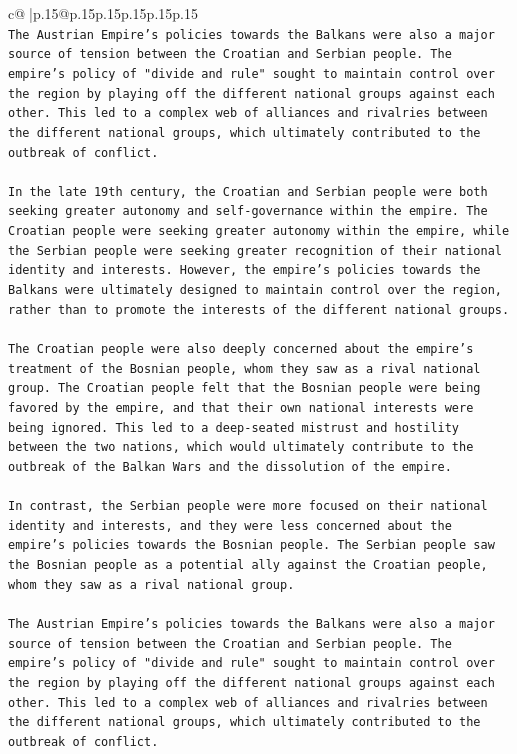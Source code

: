 \documentclass{article}
\begin{document}
{\begin{supertabular}{c@{$\;$}|p{.15\linewidth}@{}p{.15\linewidth}p{.15\linewidth}p{.15\linewidth}p{.15\linewidth}p{.15\linewidth}}
{{{\\ 
\texttt{The Austrian Empire's policies towards the Balkans were also a major source of tension between the Croatian and Serbian people. The empire's policy of "divide and rule" sought to maintain control over the region by playing off the different national groups against each other. This led to a complex web of alliances and rivalries between the different national groups, which ultimately contributed to the outbreak of conflict.} \\
\\ 
\texttt{In the late 19th century, the Croatian and Serbian people were both seeking greater autonomy and self{-}governance within the empire. The Croatian people were seeking greater autonomy within the empire, while the Serbian people were seeking greater recognition of their national identity and interests. However, the empire's policies towards the Balkans were ultimately designed to maintain control over the region, rather than to promote the interests of the different national groups.} \\
\\ 
\texttt{The Croatian people were also deeply concerned about the empire's treatment of the Bosnian people, whom they saw as a rival national group. The Croatian people felt that the Bosnian people were being favored by the empire, and that their own national interests were being ignored. This led to a deep{-}seated mistrust and hostility between the two nations, which would ultimately contribute to the outbreak of the Balkan Wars and the dissolution of the empire.} \\
\\ 
\texttt{In contrast, the Serbian people were more focused on their national identity and interests, and they were less concerned about the empire's policies towards the Bosnian people. The Serbian people saw the Bosnian people as a potential ally against the Croatian people, whom they saw as a rival national group.} \\
\\ 
\texttt{The Austrian Empire's policies towards the Balkans were also a major source of tension between the Croatian and Serbian people. The empire's policy of "divide and rule" sought to maintain control over the region by playing off the different national groups against each other. This led to a complex web of alliances and rivalries between the different national groups, which ultimately contributed to the outbreak of conflict.} \\
\\ 
}}}
\end{supertabular}}
\end{document}

